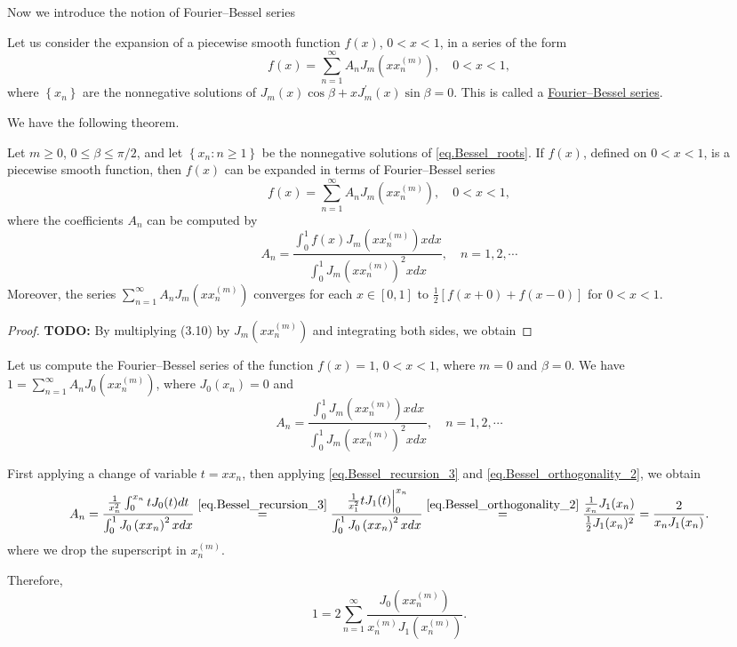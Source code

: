 Now we introduce the notion of Fourier--Bessel series

\begin{definition}
    Let us consider the expansion of a piecewise smooth function $f(x)$, $0<x<1$, in a series of the form
$$
f(x)=\sum_{n=1}^{\infty} A_n J_m\left(x x_n^{(m)}\right), \quad 0<x<1,
$$
where $\left\{x_n\right\}$ are the nonnegative solutions of $J_m(x) \cos \beta+x J_m^{\prime}(x) \sin \beta=0$. This is called a \underline{Fourier--Bessel series}. 
\end{definition}

We have the following theorem.

\begin{theorem}[]
Let $m \geq 0$, $0 \leq \beta \leq \pi / 2$, and let $\left\{x_n: n \geq 1\right\}$ be the nonnegative solutions of \eqref{eq.Bessel_roots}. If $f(x)$, defined on $0<x<1$, is a piecewise smooth function, then $f(x)$ can be expanded in terms of Fourier--Bessel series
$$
    f(x)=\sum_{n=1}^{\infty} A_n J_m\left(x x_n^{(m)}\right), \quad 0<x<1,
$$
where the coefficients $A_n$ can be computed by
$$
    A_n=\frac{\int_0^1 f(x) J_m\left(x x_n^{(m)}\right) x d x}{\int_0^1 J_m\left(x x_n^{(m)}\right)^2 x d x}, \quad n=1,2, \cdots
$$
Moreover, the series $\sum_{n=1}^{\infty} A_n J_m\left(x x_n^{(m)}\right)$ converges for each $x \in[0,1]$ to $\frac{1}{2}[f(x+0)+f(x-0)]$ for $0<x<1$.
\end{theorem}
\begin{proof}
    \textbf{TODO: } By multiplying (3.10) by $J_m\left(x x_n^{(m)}\right)$ and integrating both sides, we obtain
\end{proof}

\begin{example}[]
Let us compute the Fourier--Bessel series of the function $f(x)=1$, $0<x<1$, where $m=0$ and $\beta=0$. We have $1=\sum_{n=1}^{\infty} A_n J_0\left(x x_n^{(m)}\right)$, where $J_0(x_n)=0$ and
$$
A_n=\frac{\int_0^1 J_m\left(x x_n^{(m)}\right) x d x}{\int_0^1 J_m\left(x x_n^{(m)}\right)^2 x d x}, \quad n=1,2, \cdots
$$

First applying a change of variable $t = xx_n$, then applying \eqref{eq.Bessel_recursion_3} and \eqref{eq.Bessel_orthogonality_2}, we obtain
$$
A_n=\frac{\frac{1}{x_n^2} \int_0^{x_n} t J_0(t) d t}{\int_0^1 J_0\left(x x_n\right)^2 x d x}\overset{\eqref{eq.Bessel_recursion_3}}{=}\frac{\left.\frac{1}{x_1^2} t J_1(t)\right|_0 ^{x_n}}{\int_0^1 J_0\left(x x_n\right)^2 x d x}\overset{\eqref{eq.Bessel_orthogonality_2}}{=}\frac{\frac{1}{x_n} J_1(x_n)}{\frac{1}{2} J_1(x_n)^2}=\frac{2}{x_n J_1(x_n)} .
$$
where we drop the superscript in $x_n^{(m)}$.

Therefore,
$$
1=2 \sum_{n=1}^{\infty} \frac{J_0\left(x x_n^{(m)}\right)}{x_n^{(m)} J_1\left(x_n^{(m)}\right)}.
$$
\end{example}


